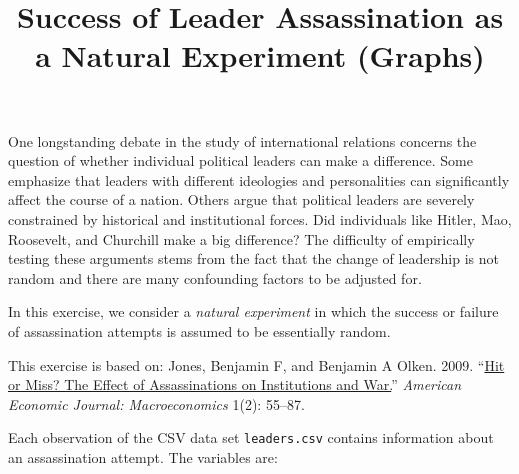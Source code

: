 \documentclass[]{article}
\title{Success of Leader Assassination as a Natural Experiment (Graphs)}
\author{}
\date{}
\begin{document}
\maketitle


One longstanding debate in the study of international relations concerns
the question of whether individual political leaders can make a
difference. Some emphasize that leaders with different ideologies and
personalities can significantly affect the course of a nation. Others
argue that political leaders are severely constrained by historical and
institutional forces. Did individuals like Hitler, Mao, Roosevelt, and
Churchill make a big difference? The difficulty of empirically testing
these arguments stems from the fact that the change of leadership is not
random and there are many confounding factors to be adjusted for.

In this exercise, we consider a \emph{natural experiment} in which the
success or failure of assassination attempts is assumed to be
essentially random.

This exercise is based on: Jones, Benjamin F, and Benjamin A Olken.
2009. ``\href{http://dx.doi.org/10.1257/mac.1.2.55}{Hit or Miss? The
Effect of Assassinations on Institutions and War.}'' \emph{American
Economic Journal: Macroeconomics} 1(2): 55--87.

Each observation of the CSV data set \texttt{leaders.csv} contains
information about an assassination attempt. The variables are:
\end{document}
